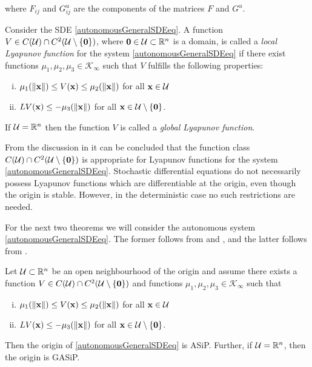 \documentclass[a4paper,12pt,twoside,BCOR=10mm]{scrbook}
\begin{document}
where $F_{ij}$ and $G_{ij}^u$ are the components of the matrices $F$ and $G^u$.

\begin{definition}
    Consider the SDE \eqref{autonomousGeneralSDEeq}. A function $V\in C(\mathcal{U})\cap C^2(\mathcal{U}\setminus \{\mathbf{0}\})$, where $\mathbf{0} \in \mathcal{U} \subset \mathbb{R}^{n}$ is a domain, is called a \textit{local Lyapunov function} for the system \eqref{autonomousGeneralSDEeq} if there exist functions $\mu_1, \mu_2, \mu_3 \in \mathcal{K}_\infty$ such that $V$ fulfills the following properties:
    \begin{enumerate}[i)]
        \item $\mu_1(\left\lVert\mathbf{x}\right\rVert) \leq V(\mathbf{x}) \leq \mu_2(\left\lVert\mathbf{x}\right\rVert)$ for all $\mathbf{x}\in \mathcal{U}$
        \item $LV(\mathbf{x}) \leq -\mu_3(\left\lVert\mathbf{x}\right\rVert)$ for all $\mathbf{x} \in \mathcal{U}\setminus \{\mathbf{0}\}$.
    \end{enumerate}
    If $\mathcal{U} = \mathbb{R}^{n}$ then the function $V$ is called a \textit{global Lyapunov function}.
\end{definition}

From the discussion in \citep[p. 146]{sdestab2012khaminskii} it can be concluded that the function class $C(\mathcal{U})\cap C^2(\mathcal{U}\setminus \{\mathbf{0}\})$ is appropriate for Lyapunov functions for the system \eqref{autonomousGeneralSDEeq}. Stochastic differential equations do not necessarily possess Lyapunov functions which are differentiable at the origin, even though the origin is stable. However, in the deterministic case no such restrictions are needed.
 
For the next two theorems we will consider the autonomous system \eqref{autonomousGeneralSDEeq}. The former follows from \citep[Corollary 5.11]{sdestab2012khaminskii} and \citep[Theorem 5.8]{sdestab2012khaminskii}, and the latter follows from \citep[Theorem 5.11]{sdestab2012khaminskii}.

\begin{theorem}
Let $\mathcal{U} \subset \mathbb{R}^{n}$ be an open neighbourhood of the origin and assume there exists a function $V\in C(\mathcal{U})\cap C^2(\mathcal{U}\setminus \{\mathbf{0}\})$ and functions $\mu_1, \mu_2, \mu_3 \in \mathcal{K}_\infty$ such that
\begin{enumerate} [i)]
    \item $\mu_1(\left\lVert\mathbf{x}\right\rVert) \leq V(\mathbf{x}) \leq \mu_2(\left\lVert\mathbf{x}\right\rVert)$ for all $\mathbf{x} \in \mathcal{U}$
    \item $LV(\mathbf{x}) \leq -\mu_3(\left\lVert\mathbf{x}\right\rVert)$ for all $\mathbf{x}\in \mathcal{U}\setminus \{\mathbf{0}\}$.
\end{enumerate}
Then the origin of \eqref{autonomousGeneralSDEeq} is ASiP. Further, if $\mathcal{U} = \mathbb{R}^{n}$, then the origin is GASiP.
\end{theorem}
\end{document}
